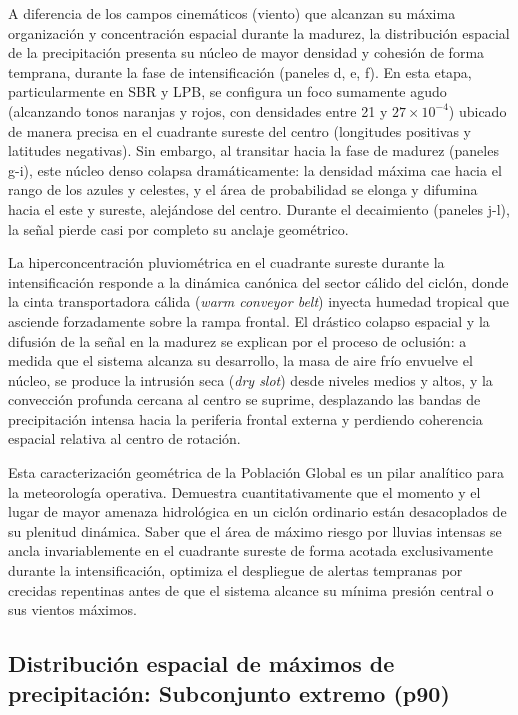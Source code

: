 A diferencia de los campos cinemáticos (viento) que alcanzan su máxima organización y concentración espacial durante la madurez, la distribución espacial de la precipitación presenta su núcleo de mayor densidad y cohesión de forma temprana, durante la fase de intensificación (paneles d, e, f). En esta etapa, particularmente en SBR y LPB, se configura un foco sumamente agudo (alcanzando tonos naranjas y rojos, con densidades entre 21 y $27 \times 10^{-4}$) ubicado de manera precisa en el cuadrante sureste del centro (longitudes positivas y latitudes negativas). Sin embargo, al transitar hacia la fase de madurez (paneles g-i), este núcleo denso colapsa dramáticamente: la densidad máxima cae hacia el rango de los azules y celestes, y el área de probabilidad se elonga y difumina hacia el este y sureste, alejándose del centro. Durante el decaimiento (paneles j-l), la señal pierde casi por completo su anclaje geométrico.

La hiperconcentración pluviométrica en el cuadrante sureste durante la intensificación responde a la dinámica canónica del sector cálido del ciclón, donde la cinta transportadora cálida (\textit{warm conveyor belt}) inyecta humedad tropical que asciende forzadamente sobre la rampa frontal. El drástico colapso espacial y la difusión de la señal en la madurez se explican por el proceso de oclusión: a medida que el sistema alcanza su desarrollo, la masa de aire frío envuelve el núcleo, se produce la intrusión seca (\textit{dry slot}) desde niveles medios y altos, y la convección profunda cercana al centro se suprime, desplazando las bandas de precipitación intensa hacia la periferia frontal externa y perdiendo coherencia espacial relativa al centro de rotación. 

Esta caracterización geométrica de la Población Global es un pilar analítico para la meteorología operativa. Demuestra cuantitativamente que el momento y el lugar de mayor amenaza hidrológica en un ciclón ordinario están desacoplados de su plenitud dinámica. Saber que el área de máximo riesgo por lluvias intensas se ancla invariablemente en el cuadrante sureste de forma acotada exclusivamente durante la intensificación, optimiza el despliegue de alertas tempranas por crecidas repentinas antes de que el sistema alcance su mínima presión central o sus vientos máximos.

\vspace{1em}

\subsection{Distribución espacial de máximos de precipitación: Subconjunto extremo (p90)}\label{subsec:kde_espacial_tp_p90}

